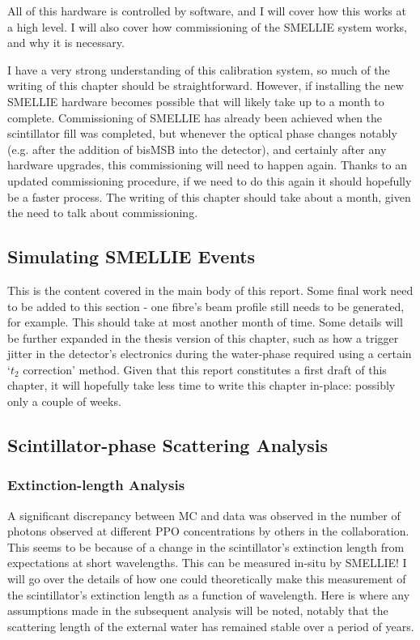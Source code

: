 All of this hardware is controlled by software, and I will cover how this works at a high level. I will also cover how commissioning of the SMELLIE system works, and why it is necessary.

I have a very strong understanding of this calibration system, so much of the writing of this chapter should be straightforward. However, if installing the new SMELLIE hardware becomes possible that will likely take up to a month to complete. Commissioning of SMELLIE has already been achieved when the scintillator fill was completed, but whenever the optical phase changes notably (e.g. after the addition of bisMSB into the detector), and certainly after any hardware upgrades, this commissioning will need to happen again. Thanks to an updated commissioning procedure, if we need to do this again it should hopefully be a faster process. The writing of this chapter should take about a month, given the need to talk about commissioning.

\subsection{Simulating SMELLIE Events}
This is the content covered in the main body of this report. Some final work need to be added to this section - one fibre's beam profile still needs to be generated, for example. This should take at most another month of time. Some details will be further expanded in the thesis version of this chapter, such as how a trigger jitter in the detector's electronics during the water-phase required using a certain `$t_2$ correction' method. Given that this report constitutes a first draft of this chapter, it will hopefully take less time to write this chapter in-place: possibly only a couple of weeks.

\subsection{Scintillator-phase Scattering Analysis}
\subsubsection{Extinction-length Analysis}
A significant discrepancy between MC and data was observed in the number of photons observed at different PPO concentrations by others in the collaboration. This seems to be because of a change in the scintillator's extinction length from expectations at short wavelengths. This can be measured in-situ by SMELLIE! I will go over the details of how one could theoretically make this measurement of the scintillator's extinction length as a function of wavelength. Here is where any assumptions made in the subsequent analysis will be noted, notably that the scattering length of the external water has remained stable over a period of years.

